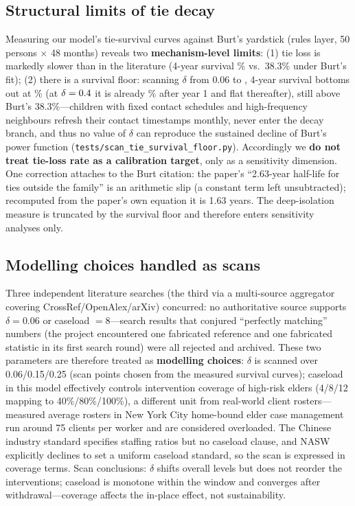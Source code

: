 \documentclass[10pt,twocolumn]{article}
\begin{document}
\subsection{Structural limits of tie decay}\label{sec:decay}
Measuring our model's tie-survival curves against Burt's yardstick (rules layer, 50 persons $\times$ 48 months) reveals two \textbf{mechanism-level limits}: (1) tie loss is markedly slower than in the literature (4-year survival \TieSurvFourYr\% vs.\ 38.3\% under Burt's fit); (2) there is a survival floor: scanning $\delta$ from 0.06 to \TieFloorDecay, 4-year survival bottoms out at \TieFloor\% (at $\delta=0.4$ it is already \TieFloorYrOne\% after year 1 and flat thereafter), still above Burt's 38.3\%---children with fixed contact schedules and high-frequency neighbours refresh their contact timestamps monthly, never enter the decay branch, and thus no value of $\delta$ can reproduce the sustained decline of Burt's power function (\texttt{tests/scan\_tie\_survival\_floor.py}). Accordingly we \textbf{do not treat tie-loss rate as a calibration target}, only as a sensitivity dimension. One correction attaches to the Burt citation: the paper's ``2.63-year half-life for ties outside the family'' is an arithmetic slip (a constant term left unsubtracted); recomputed from the paper's own equation it is 1.63 years\citep{burt2000decay}. The deep-isolation measure is truncated by the survival floor and therefore enters sensitivity analyses only.

\subsection{Modelling choices handled as scans}
Three independent literature searches (the third via a multi-source aggregator covering CrossRef/OpenAlex/arXiv) concurred: no authoritative source supports $\delta=0.06$ or caseload $=8$---search results that conjured ``perfectly matching'' numbers (the project encountered one fabricated reference and one fabricated statistic in its first search round) were all rejected and archived. These two parameters are therefore treated as \textbf{modelling choices}: $\delta$ is scanned over 0.06/0.15/0.25 (scan points chosen from the measured survival curves); caseload in this model effectively controls intervention coverage of high-risk elders (4/8/12 mapping to 40\%/80\%/100\%), a different unit from real-world client rosters---measured average rosters in New York City home-bound elder case management run around 75 clients per worker and are considered overloaded\citep{pardasani2018caseload}. The Chinese industry standard specifies staffing ratios but no caseload clause\citep{mzt064}, and NASW explicitly declines to set a uniform caseload standard\citep{nasw2013}, so the scan is expressed in coverage terms. Scan conclusions: $\delta$ shifts overall levels but does not reorder the interventions; caseload is monotone within the window and converges after withdrawal---coverage affects the in-place effect, not sustainability.
\end{document}
